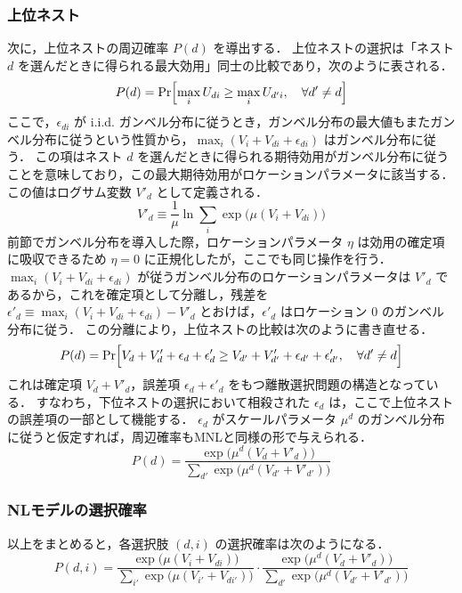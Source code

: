 \subsubsection{上位ネスト}
次に，上位ネストの周辺確率 $P(d)$ を導出する．
上位ネストの選択は「ネスト $d$ を選んだときに得られる最大効用」同士の比較であり，次のように表される．
\begin{equation}
  P(d) = \Pr\Bigl[\max_i U_{di} \geq \max_i U_{d'i}, \quad \forall d' \neq d\Bigr]
\end{equation}
ここで，$\epsilon_{di}$ が i.i.d. ガンベル分布に従うとき，ガンベル分布の最大値もまたガンベル分布に従うという性質から，$\max_i (V_i + V_{di} + \epsilon_{di})$ はガンベル分布に従う．
この項はネスト $d$ を選んだときに得られる期待効用がガンベル分布に従うことを意味しており，この最大期待効用がロケーションパラメータに該当する．
この値はログサム変数 $V'_d$ として定義される．
\begin{equation}\label{eq:nl-logsum}
  V'_d \equiv \frac{1}{\mu} \ln \sum_{i} \exp\bigl(\mu (V_i + V_{di})\bigr)
\end{equation}
前節でガンベル分布を導入した際，ロケーションパラメータ $\eta$ は効用の確定項に吸収できるため $\eta = 0$ に正規化したが，ここでも同じ操作を行う．
$\max_i(V_i + V_{di} + \epsilon_{di})$ が従うガンベル分布のロケーションパラメータは $V'_d$ であるから，これを確定項として分離し，残差を $\epsilon'_d \equiv \max_i(V_i + V_{di} + \epsilon_{di}) - V'_d$ とおけば，$\epsilon'_d$ はロケーション $0$ のガンベル分布に従う．
この分離により，上位ネストの比較は次のように書き直せる．
\begin{equation}
  P(d) = \Pr\Bigl[V_d + V'_d + \epsilon_d + \epsilon'_d \geq V_{d'} + V'_{d'} + \epsilon_{d'} + \epsilon'_{d'}, \quad \forall d' \neq d\Bigr]
\end{equation}
これは確定項 $V_d + V'_d$，誤差項 $\epsilon_d + \epsilon'_d$ をもつ離散選択問題の構造となっている．
すなわち，下位ネストの選択において相殺された $\epsilon_d$ は，ここで上位ネストの誤差項の一部として機能する．
$\epsilon_d$ がスケールパラメータ $\mu^d$ のガンベル分布に従うと仮定すれば，周辺確率もMNLと同様の形で与えられる．
\begin{equation}\label{eq:nl-marginal}
  P(d) = \frac{\exp\bigl(\mu^d (V_d + V'_d)\bigr)}{\displaystyle\sum_{d'} \exp\bigl(\mu^d (V_{d'} + V'_{d'})\bigr)}
\end{equation}

\subsubsection{NLモデルの選択確率}
以上をまとめると，各選択肢 $(d,i)$ の選択確率は次のようになる．
\begin{equation}\label{eq:nl-joint}
  P(d,i) = \frac{\exp\bigl(\mu (V_i + V_{di})\bigr)}{\displaystyle\sum_{i'} \exp\bigl(\mu (V_{i'} + V_{di'})\bigr)} \cdot \frac{\exp\bigl(\mu^d (V_d + V'_d)\bigr)}{\displaystyle\sum_{d'} \exp\bigl(\mu^d (V_{d'} + V'_{d'})\bigr)}
\end{equation}

